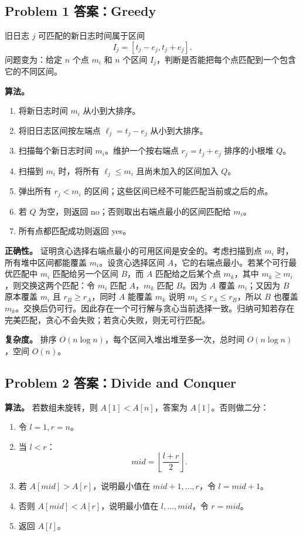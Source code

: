 \documentclass[UTF8,a4paper,11pt]{ctexart}
\begin{document}
\subsection*{Problem 1 答案：Greedy}

旧日志 $j$ 可匹配的新日志时间属于区间
\[
I_j=[t_j-e_j,t_j+e_j].
\]
问题变为：给定 $n$ 个点 $m_i$ 和 $n$ 个区间 $I_j$，判断是否能把每个点匹配到一个包含它的不同区间。

\textbf{算法。}
\begin{enumerate}
  \item 将新日志时间 $m_i$ 从小到大排序。
  \item 将旧日志区间按左端点 $\ell_j=t_j-e_j$ 从小到大排序。
  \item 扫描每个新日志时间 $m_i$。维护一个按右端点 $r_j=t_j+e_j$ 排序的小根堆 $Q$。
  \item 扫描到 $m_i$ 时，将所有 $\ell_j\le m_i$ 且尚未加入的区间加入 $Q$。
  \item 弹出所有 $r_j<m_i$ 的区间；这些区间已经不可能匹配当前或之后的点。
  \item 若 $Q$ 为空，则返回 no；否则取出右端点最小的区间匹配给 $m_i$。
  \item 所有点都匹配成功则返回 yes。
\end{enumerate}

\textbf{正确性。} 证明贪心选择右端点最小的可用区间是安全的。考虑扫描到点 $m_i$ 时，所有堆中区间都能覆盖 $m_i$。设贪心选择区间 $A$，它的右端点最小。若某个可行最优匹配中 $m_i$ 匹配给另一个区间 $B$，而 $A$ 匹配给之后某个点 $m_k$，其中 $m_k\ge m_i$，则交换这两个匹配：令 $m_i$ 匹配 $A$，$m_k$ 匹配 $B$。因为 $A$ 覆盖 $m_i$；又因为 $B$ 原本覆盖 $m_i$ 且 $r_B\ge r_A$，同时 $A$ 能覆盖 $m_k$ 说明 $m_k\le r_A\le r_B$，所以 $B$ 也覆盖 $m_k$。交换后仍可行。因此存在一个可行解与贪心当前选择一致。归纳可知若存在完美匹配，贪心不会失败；若贪心失败，则无可行匹配。

\textbf{复杂度。} 排序 $O(n\log n)$，每个区间入堆出堆至多一次，总时间 $O(n\log n)$，空间 $O(n)$。

\subsection*{Problem 2 答案：Divide and Conquer}

\textbf{算法。} 若数组未旋转，则 $A[1]<A[n]$，答案为 $A[1]$。否则做二分：
\begin{enumerate}
  \item 令 $l=1,r=n$。
  \item 当 $l<r$：
  \[
  mid=\left\lfloor\frac{l+r}{2}\right\rfloor.
  \]
  \item 若 $A[mid]>A[r]$，说明最小值在 $mid+1,\ldots,r$，令 $l=mid+1$。
  \item 否则 $A[mid]<A[r]$，说明最小值在 $l,\ldots,mid$，令 $r=mid$。
  \item 返回 $A[l]$。
\end{enumerate}
\end{document}
